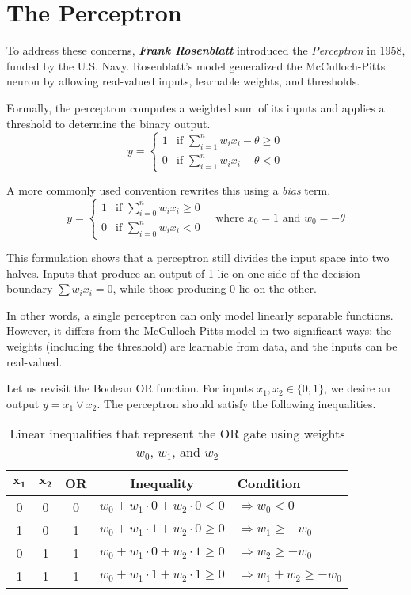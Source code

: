 
\section{The Perceptron}

To address these concerns, \textit{\textbf{Frank Rosenblatt}} introduced the \textit{Perceptron} in 1958, funded by the U.S. Navy. Rosenblatt's model generalized the McCulloch-Pitts neuron by allowing real-valued inputs, learnable weights, and thresholds.

Formally, the perceptron computes a weighted sum of its inputs and applies a threshold to determine the binary output.
\[
y =
\begin{cases}
1 & \text{if } \sum_{i=1}^{n} w_i x_i - \theta \geq 0 \\
0 & \text{if } \sum_{i=1}^{n} w_i x_i - \theta < 0
\end{cases}
\]

A more commonly used convention rewrites this using a \textit{bias} term.
\[
y =
\begin{cases}
1 & \text{if } \sum_{i=0}^{n} w_i x_i \geq 0 \\
0 & \text{if } \sum_{i=0}^{n} w_i x_i < 0
\end{cases}
\quad \text{where } x_0 = 1 \text{ and } w_0 = -\theta
\]

This formulation shows that a perceptron still divides the input space into two halves. Inputs that produce an output of 1 lie on one side of the decision boundary $\sum w_i x_i = 0$, while those producing 0 lie on the other. 

In other words, a single perceptron can only model linearly separable functions. However, it differs from the McCulloch-Pitts model in two significant ways: the weights (including the threshold) are learnable from data, and the inputs can be real-valued.

Let us revisit the Boolean OR function. For inputs $x_1, x_2 \in \{0,1\}$, we desire an output $y = x_1 \lor x_2$. The perceptron should satisfy the following inequalities. 

\begin{table}[h]
\centering
\begin{tabular}{ccccl}
$\mathbf{x_1}$ & $\mathbf{x_2}$ & \textbf{OR} & \textbf{Inequality} & \textbf{Condition} \\
\hline
0 & 0 & 0 & $w_0 + w_1 \cdot 0 + w_2 \cdot 0 < 0$ & $\Rightarrow w_0 < 0$ \\
1 & 0 & 1 & $w_0 + w_1 \cdot 1 + w_2 \cdot 0 \geq 0$ & $\Rightarrow w_1 \geq -w_0$ \\
0 & 1 & 1 & $w_0 + w_1 \cdot 0 + w_2 \cdot 1 \geq 0$ & $\Rightarrow w_2 \geq -w_0$ \\
1 & 1 & 1 & $w_0 + w_1 \cdot 1 + w_2 \cdot 1 \geq 0$ & $\Rightarrow w_1 + w_2 \geq -w_0$
\end{tabular}
\caption{Linear inequalities that represent the OR gate using weights $w_0$, $w_1$, and $w_2$}
\end{table}


